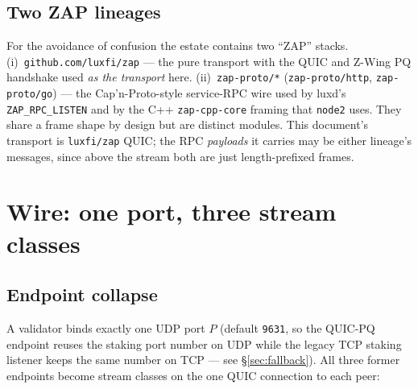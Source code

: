 \documentclass[11pt,a4paper]{article}
\newcommand{\code}[1]{\texttt{#1}}
\begin{document}
\subsection{Two ZAP lineages}\label{sec:lineages}

For the avoidance of confusion the estate contains two ``ZAP'' stacks.
(i)~\code{github.com/luxfi/zap} --- the pure transport with the QUIC and
Z-Wing PQ handshake used \emph{as the transport} here. (ii)~\code{zap-proto/*}
(\code{zap-proto/http}, \code{zap-proto/go}) --- the Cap'n-Proto-style
service-RPC wire used by luxd's \code{ZAP\_RPC\_LISTEN} and by the
C++ \code{zap-cpp-core} framing that \code{node2} uses. They share a
frame shape by design but are distinct modules. This document's
transport is \code{luxfi/zap} QUIC; the RPC \emph{payloads} it carries
may be either lineage's messages, since above the stream both are just
length-prefixed frames.

\section{Wire: one port, three stream classes}\label{sec:wire}

\subsection{Endpoint collapse}

A validator binds exactly one UDP port $P$ (default \code{9631}, so the
QUIC-PQ endpoint reuses the staking port number on UDP while the legacy
TCP staking listener keeps the same number on TCP --- see
\S\ref{sec:fallback}). All three former endpoints become stream classes
on the one QUIC connection to each peer:

\begin{center}
\end{center}
\end{document}
